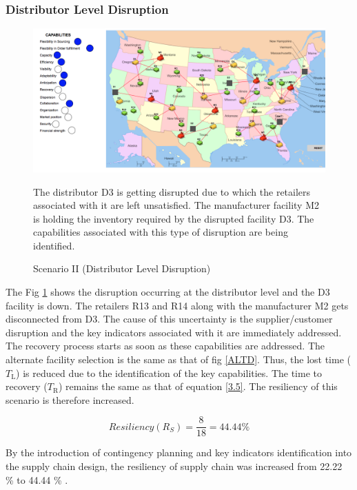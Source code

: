 \subsubsection{Distributor Level Disruption}

\begin{figure}[H]
  \centering
  \includegraphics[width=6.5in]{figures/pdf/S2DLD.png}\\
  \caption{Scenario II (Distributor Level Disruption)}
  {The distributor D3 is getting disrupted due to which the retailers associated with it are left unsatisfied. The manufacturer facility M2 is holding the inventory required by the disrupted facility D3. The capabilities associated with this type of disruption are being identified.}
  \label{S2DL}
\end{figure}   

The Fig \ref{S2DL} shows the disruption occurring at the distributor level and the D3 facility is down. The retailers R13 and R14 along with the manufacturer M2 gets disconnected from D3. The cause of this uncertainty is the supplier/customer disruption and the key indicators associated with it are immediately addressed. The recovery process starts as soon as these capabilities are addressed. The alternate facility selection is the same as that of fig \ref{ALTD}. Thus, the lost time ($T_{\text{L}}$) is reduced due to the identification of the key capabilities. The time to recovery ($T_{\text{R}}$) remains the same as that of equation \ref{3.5}. The resiliency of this scenario is therefore increased.

\begin{equation}
    Resiliency(R_S) = \frac{8}{18} = 44.44 \% \label{3.20}
\end{equation}

By the introduction of contingency planning and key indicators identification into the supply chain design, the resiliency of supply chain was increased from 22.22 \% to 44.44 \% .

